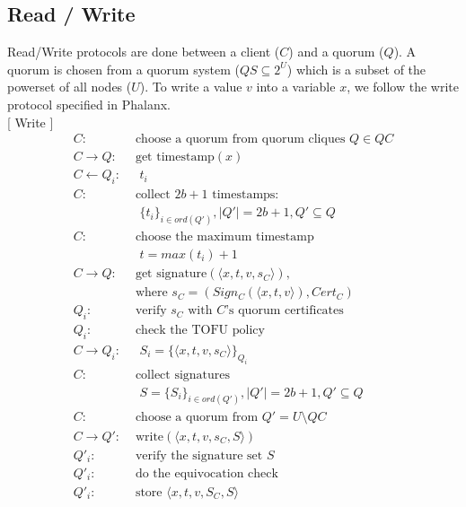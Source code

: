 \documentclass[twoside,twocolumn,10pt,fleqn]{article}
\begin{document}
\subsection{Read / Write}
\label{rw}
Read/Write protocols are done between a client ($C$) and a quorum
($Q$). A quorum is chosen from a quorum system ($QS \subseteq 2^U$)
which is a subset of the powerset of all nodes ($U$).  To write a
value $v$ into a variable $x$, we follow the write protocol specified
in Phalanx.\\

[ Write ]
\begin{align*}
  C :& \text{ choose a quorum from quorum cliques } Q \in QC \\
  C \rightarrow Q :& \text{ get timestamp}(x) \\
  C \leftarrow Q_i :& \text{ } t_i \\
  C :& \text{ collect } 2b+1 \text{ timestamps: } \\
     & \text{ } \{t_i\}_{i \in ord(Q')}, |Q'|=2b+1, Q'\subseteq Q \\
  C :& \text{ choose the maximum timestamp } \\
     & \text{ } t = max(t_i) + 1 \\
  C \rightarrow Q :& \text{ get signature}(\langle x, t, v, s_C \rangle),\\
     & \text{ where } s_C = (Sign_C(\langle x, t, v \rangle), Cert_C) \\
  Q_i :& \text{ verify $s_C$ with $C$'s quorum certificates} \\
  Q_i :& \text{ check the TOFU policy} \\
  C \rightarrow Q_i :& \text{ } S_i = \{\langle x, t, v, s_C \rangle\}_{Q_i} \\
  C :& \text{ collect signatures } \\
     & \text{ } S = \{S_i\}_{i \in ord(Q')}, |Q'| = 2b + 1, Q' \subseteq Q \\
  C :& \text{ choose a quorum from } Q' = U \setminus QC \\
  C \rightarrow Q' :& \text{ write}(\langle x, t, v, s_C, S \rangle) \\
  Q'_i :& \text{ verify the signature set $S$} \\
  Q'_i :& \text{ do the equivocation check} \\
  Q'_i :& \text{ store } \langle x, t, v, S_C, S \rangle
\end{align*}
\end{document}
